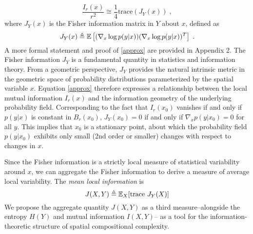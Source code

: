 		\begin{equation}
			\frac{I_r(x)}{r^2} \cong \frac{1}{4} \text{trace} (J_Y(x))\;, \label{approx}
		\end{equation}
		where $J_Y(x)$ is the Fisher information matrix in $Y$ about $x$, defined as 
		\begin{equation}
			J_Y(x) \triangleq \mathbb{E}\left[ (\nabla_x \log p(y|x))(\nabla_x \log p(y|x))^T \right]\;.
		\end{equation}
		A more formal statement and proof of \eqref{approx} are provided in Appendix 2. The Fisher information $J_Y$ is a fundamental quantity in statistics and information theory. From a geometric perspective, $J_Y$ provides the natural intrinsic metric in the geometric space of probability distributions parameterized by the spatial variable $x$. Equation \eqref{approx} therefore expresses a relationship between the local mutual information $I_r(x)$ and the information geometry of the underlying probability field. Corresponding to the fact that $I_r(x_0)$ vanishes if and only if $p(y|x)$ is constant in $B_r(x_0)$, $J_Y(x_0) = 0$ if and only if $\nabla_x p(y|x_0) = 0$ for all $y$. This implies that $x_0$ is a stationary point, about which the probability field $p(y|x_0)$ exhibits only small (2nd order or smaller) changes with respect to changes in $x$. 

		Since the Fisher information is a strictly local measure of statistical variability around $x$, we can aggregate the Fisher information to derive a measure of average local variability. The \emph{mean local information} is 
		\begin{equation}
		J(X,Y) \triangleq \mathbb{E}_X[\text{trace }J_Y(X)]
		\end{equation} 
		We propose the aggregate quantity $J(X,Y)$ as a third  measure--alongside the entropy $H(Y)$ and mutual information $I(X,Y)$-- as a tool for the information-theoretic structure of spatial compositional complexity. 

